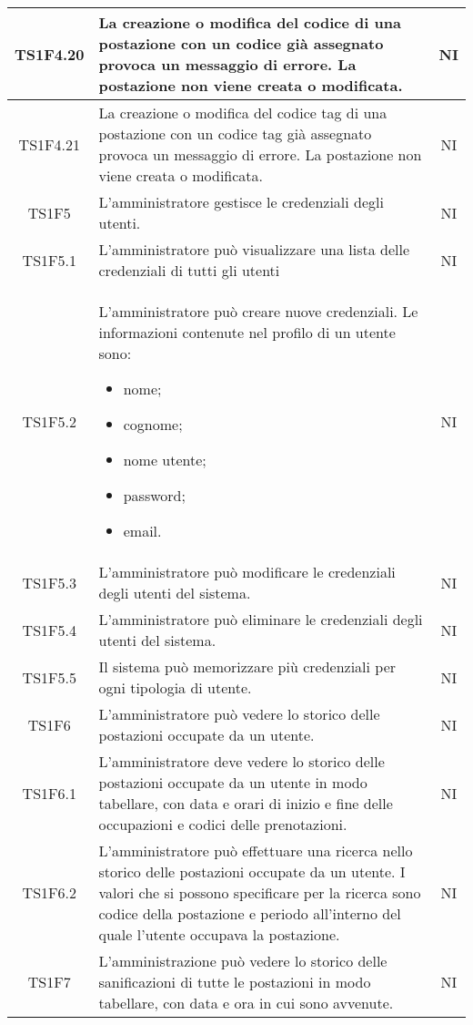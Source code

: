 \begin{center}
\begin{longtable}{|c|p{10cm}|c|}
			\hline	
			TS1F4.20 & La creazione o modifica del codice di una postazione con un codice già assegnato provoca un messaggio di errore. La postazione non viene creata o modificata. & NI \\	
			\hline	
			TS1F4.21 & La creazione o modifica del codice tag di una postazione con un codice tag già assegnato provoca un messaggio di errore. La postazione non viene creata o modificata. & NI \\	
			\hline	
			TS1F5 & L'amministratore gestisce le credenziali degli utenti. & NI \\	
			\hline
			TS1F5.1 & L'amministratore può visualizzare una lista delle credenziali di tutti gli utenti & NI \\	
			\hline
			TS1F5.2 & L'amministratore può creare nuove credenziali. Le informazioni contenute nel profilo di un utente sono:
			\begin{itemize}
				\item nome;
				\item cognome;
				\item nome utente;
				\item password;
				\item email.
			\end{itemize} & NI \\	
			\hline
			TS1F5.3 & L’amministratore può modificare le credenziali degli utenti del sistema. & NI \\	
			\hline
			TS1F5.4 & L’amministratore può eliminare le credenziali degli utenti del sistema. & NI \\	
			\hline
			TS1F5.5 & Il sistema può memorizzare più credenziali per ogni tipologia di utente. & NI \\	
			\hline
			TS1F6 & L'amministratore può vedere lo storico delle postazioni occupate da un utente. & NI \\	
			\hline
			TS1F6.1 & L'amministratore deve vedere lo storico delle postazioni occupate da un utente in modo tabellare, con data e orari di inizio e fine delle occupazioni e codici delle prenotazioni. & NI \\	
			\hline
			TS1F6.2 & L'amministratore può effettuare una ricerca nello storico delle postazioni occupate da un utente. I valori che si possono specificare per la ricerca sono codice della postazione e periodo all'interno del quale l'utente occupava la postazione. & NI \\	
			\hline
			TS1F7 & L'amministrazione può vedere lo storico delle sanificazioni di tutte le postazioni in modo tabellare, con data e ora in cui sono avvenute. & NI \\	

\end{longtable}
\end{center}
